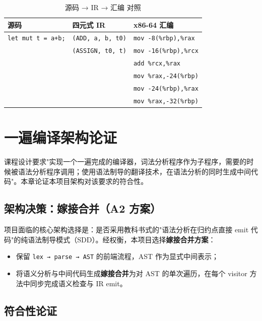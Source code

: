 \documentclass[12pt,a4paper]{ctexart}
\begin{document}
\begin{table}[H]
\centering
\caption{源码 → IR → 汇编 对照}
\begin{tabular}{|l|l|l|}
\hline
\textbf{源码} & \textbf{四元式 IR} & \textbf{x86-64 汇编} \\
\hline
\texttt{let mut t = a+b;} & \texttt{(ADD, a, b, t0)} & \texttt{mov -8(\%rbp),\%rax} \\
 & \texttt{(ASSIGN, t0, t)} & \texttt{mov -16(\%rbp),\%rcx} \\
 & & \texttt{add \%rcx,\%rax} \\
 & & \texttt{mov \%rax,-24(\%rbp)} \\
 & & \texttt{mov -24(\%rbp),\%rax} \\
 & & \texttt{mov \%rax,-32(\%rbp)} \\
\hline
\end{tabular}
\end{table}

\newpage

\section{一遍编译架构论证}

课程设计要求"实现一个一遍完成的编译器，词法分析程序作为子程序，需要的时候被语法分析程序调用；使用语法制导的翻译技术，在语法分析的同时生成中间代码"。本章论证本项目架构对该要求的符合性。

\subsection{架构决策：嫁接合并（A2 方案）}

项目面临的核心架构选择是：是否采用教科书式的"语法分析在归约点直接 emit 代码"的纯语法制导模式（SDD）。经权衡，本项目选择\textbf{嫁接合并方案}：

\begin{itemize}
    \item 保留 \texttt{lex → parse → AST} 的前端流程，AST 作为显式中间表示；
    \item 将语义分析与中间代码生成\textbf{嫁接合并}为对 AST 的单次遍历，在每个 visitor 方法中同步完成语义检查与 IR emit。
\end{itemize}

\subsection{符合性论证}
\end{document}
